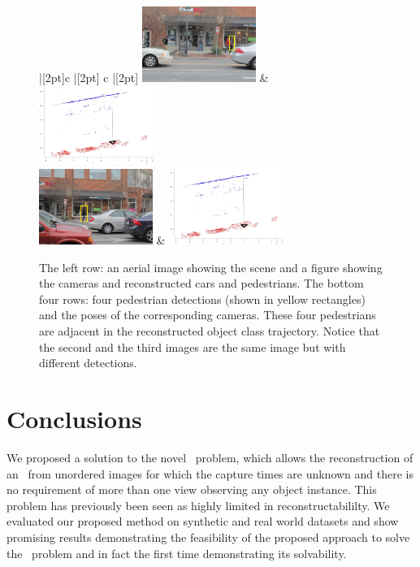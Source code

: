 \begin{figure}[t]
\begin{tabu}{ |[2pt]c |[2pt] c |[2pt]}
\tabucline[2pt]{-}
\includegraphics[width=0.33\textwidth]{chapter4/resource/cleanFrame085.jpg} & 
\includegraphics[width=0.33\textwidth]{chapter4/resource/Frame_085_crop.jpg} \\
\tabucline[2pt]{-}
\includegraphics[width=0.33\textwidth]{chapter4/resource/cleanFrame086.jpg} &
\includegraphics[width=0.33\textwidth]{chapter4/resource/Frame_086_crop.jpg}\\
\tabucline[2pt]{-}
\end{tabu}
\caption{The left row: an aerial image showing the scene and a figure showing the cameras and reconstructed cars and pedestrians. The bottom four rows: four pedestrian detections (shown in yellow rectangles) and the poses of the corresponding cameras. These four pedestrians are adjacent in the reconstructed object class trajectory. Notice that the second and the third images are the same image but with different detections.}
\label{fig:franklin_Recon}
\end{figure}

\section{Conclusions}
We proposed a solution to the novel \jost~problem, which allows the reconstruction of an \oct~from unordered images for which the capture times are unknown and there is no requirement of more than one view observing any object instance. This problem has previously been seen as highly limited in reconstructabililty. We evaluated our proposed method on synthetic and real world datasets and show promising results demonstrating the feasibility of the proposed approach to solve the \jost~problem and in fact the first time demonstrating its solvability.

